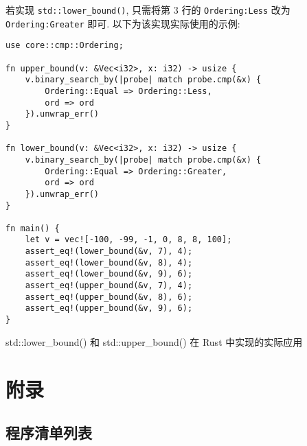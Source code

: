 \documentclass{crbook}
\begin{document}
若实现 \texttt{std::lower\_bound()}, 只需将第 3 行的 \texttt{Ordering:Less} 改为 \texttt{Ordering:Greater} 即可. 以下为该实现实际使用的示例:

\begin{listing}
    \linespread{1}
    \begin{verbatim}
use core::cmp::Ordering;

fn upper_bound(v: &Vec<i32>, x: i32) -> usize {
    v.binary_search_by(|probe| match probe.cmp(&x) {
        Ordering::Equal => Ordering::Less,
        ord => ord
    }).unwrap_err()
}

fn lower_bound(v: &Vec<i32>, x: i32) -> usize {
    v.binary_search_by(|probe| match probe.cmp(&x) {
        Ordering::Equal => Ordering::Greater,
        ord => ord
    }).unwrap_err()
}

fn main() {
    let v = vec![-100, -99, -1, 0, 8, 8, 100];
    assert_eq!(lower_bound(&v, 7), 4);
    assert_eq!(lower_bound(&v, 8), 4);
    assert_eq!(lower_bound(&v, 9), 6);
    assert_eq!(upper_bound(&v, 7), 4);
    assert_eq!(upper_bound(&v, 8), 6);
    assert_eq!(upper_bound(&v, 9), 6);
}
    \end{verbatim}
    \caption{std::lower\_bound() 和 std::upper\_bound() 在 Rust 中实现的实际应用}
\end{listing}

\newpage
\section{附录}
\subsection{程序清单列表}
\makeatletter
{}
\makeatother
\end{document}
